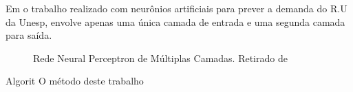 \documentclass[	12pt, Times, openright, twoside, a4paper, english, brazil]{abntex2}
\begin{document}
Em \cite{Rocha2011} o trabalho realizado com neurônios artificiais para prever a demanda do R.U da Unesp, envolve apenas uma única camada de entrada e uma segunda camada para saída. 
\begin{figure}[!ht]
	\caption{Rede Neural Perceptron de Múltiplas Camadas. Retirado de  \cite{Rocha2011} \label{fig:rnaRocha}}
\end{figure}
Algorit
O método deste trabalho
\end{document}
